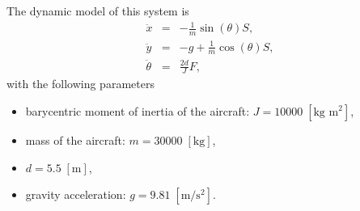 \documentclass{article}
\begin{document}
\noindent
The dynamic model of this system is
\begin{eqnarray*}
\ddot{x}  &=&- \frac{1}{m}  \sin (\theta) S,\\
\ddot{y} &=&- g + \frac{1}{m} \cos ( \theta) S, \\
 \ddot{\theta} &=& \frac{2 d}{J}  F,
\end{eqnarray*}
with the following parameters 
\begin{itemize}
\item
barycentric moment of inertia of the aircraft: $J = 10 000 \; [\text{kg m}^2]$, 
\item
mass of the aircraft: $m = 30 000 \; [\text{kg}]$, 
\item
$d = 5.5 \; [\text{m}]$, 
\item
gravity acceleration: $g = 9.81 \; [\text{m}/\text{s}^2]$.
\end{itemize}
\end{document}
